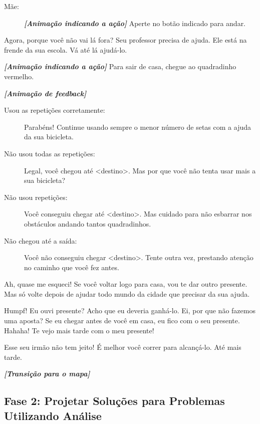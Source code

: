 \begin{description}
\begin{description}
\begin{description}
            \item[Mãe:] \textbf{\textit{[Animação indicando a ação]}} Aperte no botão indicado para andar.
		\end{description}
        \item[Mãe:] Agora, porque você não vai lá fora? Seu professor precisa de ajuda. Ele está na frende da sua escola. Vá até lá ajudá-lo.
        \item[Mãe:] \textbf{\textit{[Animação indicando a ação]}} Para sair de casa, chegue ao quadradinho vermelho.
        \item \textbf{\textit{[Animação de feedback]}}
        \begin{description}
            \item[]
        	\item[Usou as repetições corretamente:] Parabéns! Continue usando sempre o menor número de setas com a ajuda da sua bicicleta.
			\item[Não usou todas as repetições:] Legal, você chegou até <destino>. Mas por que você não tenta usar mais a sua bicicleta?
			\item[Não usou repetições:] Você conseguiu chegar até <destino>. Mas cuidado para não esbarrar nos obstáculos andando tantos quadradinhos.
			\item[Não chegou até a saída:] Você não conseguiu chegar <destino>. Tente outra vez, prestando atenção no caminho que você fez antes.
        \end{description}
        \item[Mãe:] Ah, quase me esqueci! Se você voltar logo para casa, vou te dar outro presente. Mas só volte depois de ajudar todo mundo da cidade que precisar da sua ajuda.
        \item[Irmão/Irmã:] Humpf! Eu ouvi presente? Acho que eu deveria ganhá-lo. Ei, por que não fazemos uma aposta? Se eu chegar antes de você em casa, eu fico com o seu presente. Hahaha! Te vejo mais tarde com o meu presente!
        \item[Mãe:] Esse seu irmão não tem jeito! É melhor você correr para alcançá-lo. Até mais tarde.
        \item \textbf{\textit{[Transição para o mapa]}}
    \end{description}
\end{description}

\subsection{Fase 2: Projetar Soluções para Problemas Utilizando Análise} \label{ssec:fase_2}

